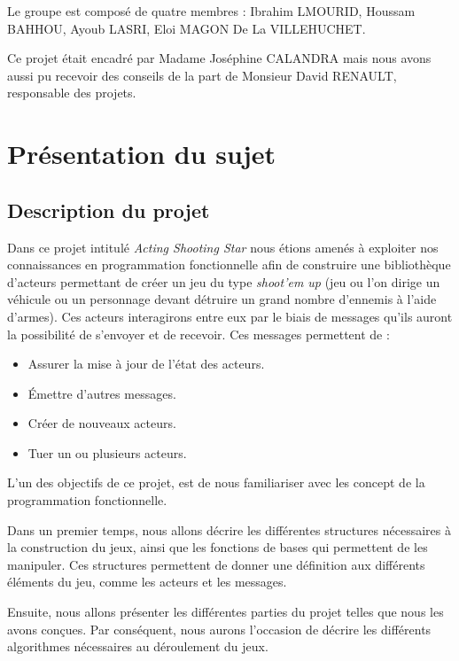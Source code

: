 \documentclass[a4paper,10pt]{article}
\begin{document}
Le groupe est composé de quatre membres :  Ibrahim LMOURID, Houssam BAHHOU, Ayoub LASRI, Eloi MAGON De La VILLEHUCHET.
\newline

Ce projet était encadré par Madame Joséphine CALANDRA mais nous avons aussi pu recevoir des conseils de la part de Monsieur David RENAULT, responsable des projets.

\section{Présentation du sujet}
\label{presentation}
\subsection{Description du projet}
Dans ce projet intitulé \textit{Acting Shooting Star} nous étions amenés à exploiter nos connaissances en programmation fonctionnelle afin de construire une bibliothèque d'acteurs permettant de créer un jeu du type \textit{shoot'em up} (jeu ou l'on dirige un véhicule ou un personnage devant détruire un grand nombre d'ennemis à l'aide d'armes). Ces acteurs interagirons entre eux par le biais de messages qu'ils auront la possibilité de s'envoyer et de recevoir. Ces messages permettent de :\\

\begin{itemize}
    \item Assurer la mise à jour de l'état des acteurs.\\
    \item Émettre d'autres messages.\\
    \item Créer de nouveaux acteurs.\\
    \item Tuer un ou plusieurs acteurs.\\
\end{itemize}
L'un des objectifs de ce projet, est de nous familiariser avec les concept de la programmation fonctionnelle.


Dans un premier temps, nous allons décrire les différentes structures nécessaires à la construction du jeux, ainsi que les fonctions de bases qui permettent de les manipuler. Ces structures permettent de donner une définition aux différents éléments du jeu, comme les acteurs et les messages.
\newline

Ensuite, nous allons présenter les différentes parties du projet telles que nous les avons conçues. Par conséquent, nous aurons l'occasion de décrire les différents algorithmes nécessaires au déroulement du jeux. 
\newline
\end{document}
